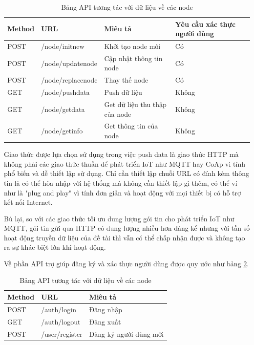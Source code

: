 \begin{table}[H]
	\centering
	\caption{Bảng API tương tác với dữ liệu về các node}
	\begin{tabular}{|l|l|l|l|}
		\hline
		Method & URL            & Miêu tả         & Yêu cầu xác thực người dùng        \\ \hline
		POST   & /node/initnew       & Khởi tạo node mới                & Có           \\ \hline
		POST   & /node/updatenode     & Cập nhật thông tin node & Có \\ \hline
		POST   & /node/replacenode       & Thay thế node  & Có       \\ \hline
		GET   & /node/pushdata & Push dữ liệu               &         Không                \\ \hline
		GET   & /node/getdata    & Get dữ liệu thu thập của node         &  Không      \\ \hline
		GET   & /node/getinfo   & Get thông tin của node & Không  \\ \hline
	\end{tabular}
	\label{table: apilist}
\end{table}

Giao thức được lựa chọn sử dụng trong việc push data là giao thức HTTP mà không phải các giao thức thuần để phát triển IoT như MQTT hay CoAp vì tính phổ biến và dễ thiết lập sử dụng. Chỉ cần thiết lập chuỗi URL có đính kèm thông tin là có thể hòa nhập với hệ thống mà không cần thiết lập gì thêm, có thể ví như là "plug and play" vì tính đơn giản và hoạt động với mọi thiết bị có hỗ trợ kết nối Internet.

Bù lại, so với các giao thức tối ưu dung lượng gói tin cho phát triển IoT như MQTT, gói tin gửi qua HTTP có dung lượng nhiều hơn đáng kể nhưng với tần số hoạt động truyền dữ liệu của đề tài thì vẫn có thể chấp nhận được và không tạo ra sự khác biệt lớn khi hoạt động.

Về phần API trợ giúp đăng ký và xác thực người dùng được quy ước như bảng \ref{table: apiuser}.
\begin{table}[H]
	\centering
	\caption{Bảng API tương tác với dữ liệu về các node}
	\begin{tabular}{|l|l|l|}
		\hline
		Method & URL            & Miêu tả                \\ \hline
		POST   & /auth/login       & Đăng nhập                           \\ \hline
		GET   & /auth/logout   & Đăng xuất   \\ \hline
		POST   & /user/register     & Đăng ký người dùng mới \\ \hline
	\end{tabular}
	\label{table: apiuser}
\end{table}
